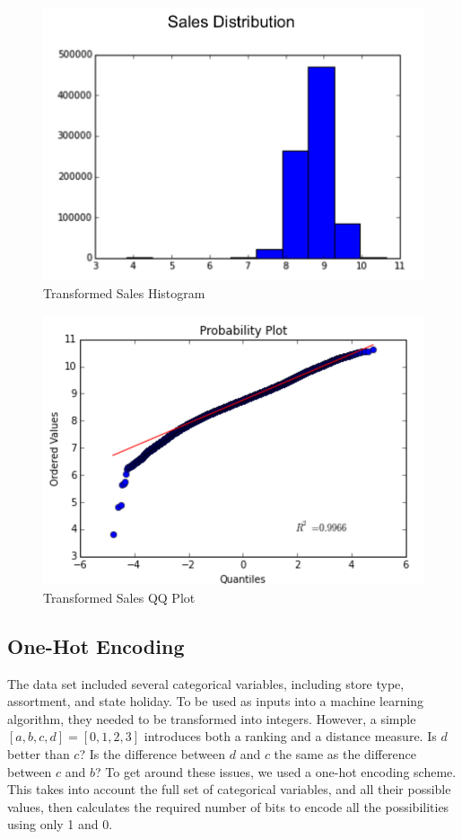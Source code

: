 \documentclass[DIV=calc, paper=a4, fontsize=11pt]{scrartcl}	 %
\begin{document}
\begin{figure}[!htbp]
\centering
\caption{Transformed Sales Histogram}
\label{normalhist}
\includegraphics[scale=0.75]{figures/salesnormalhist.png}
\end{figure} 

\begin{figure}[!htbp]
\centering
\caption{Transformed Sales QQ Plot}
\label{normalqq}
\includegraphics[scale=0.75]{figures/salesnormalQQ.png}
\end{figure} 

\subsection*{One-Hot Encoding}
The data set included several categorical variables, including store type, assortment, and state holiday. To be used as inputs into a machine learning algorithm, they needed to be transformed into integers. However, a simple $[a, b, c, d] = [0, 1, 2, 3]$ introduces both a ranking and a distance measure. Is $d$ better than $c$? Is the difference between $d$ and $c$ the same as the difference between $c$ and $b$? To get around these issues, we used a one-hot encoding scheme. This takes into account the full set of categorical variables, and all their possible values, then calculates the required number of bits to encode all the possibilities using only 1 and 0. 
\end{document}
